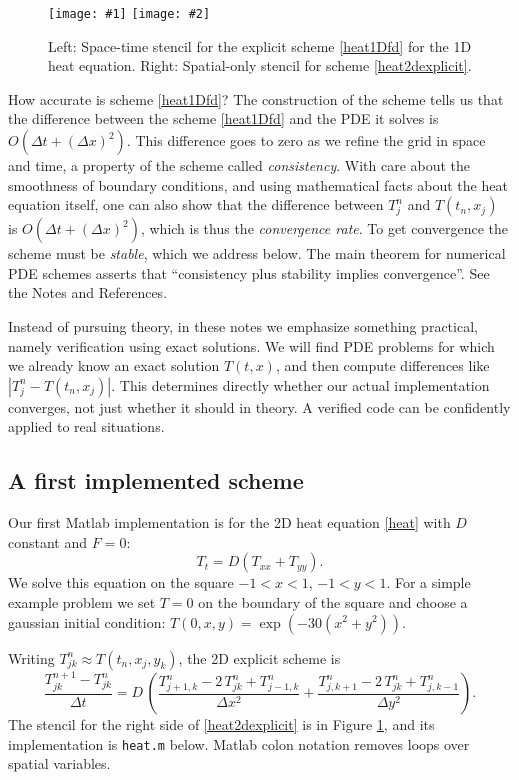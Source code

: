 \documentclass[letterpaper,final,12pt,reqno]{amsart}
\newcommand{\twofigsizes}[5]{
\begin{figure}[ht]
\centering
\texttt{[image: \#1]} \quad
\texttt{[image: \#2]}
\caption{#3}
\label{fig:#1}
\end{figure}}
\begin{document}
\twofigsizes{expstencil}{exp2dstencil}{Left: Space-time stencil for the explicit scheme \eqref{heat1Dfd} for the 1D heat equation.  Right: Spatial-only stencil for scheme \eqref{heat2dexplicit}.}{2.0in}{2.1in}

How accurate is scheme \eqref{heat1Dfd}?  The construction of the scheme tells us that the difference between the scheme \eqref{heat1Dfd} and the PDE it solves is $O(\Delta t + (\Delta x)^2)$.  This difference goes to zero as we refine the grid in space and time, a property of the scheme called \emph{consistency}.  With care about the smoothness of boundary conditions, and using mathematical facts about the heat equation itself, one can also show that the difference between $T_j^n$ and $T(t_n,x_j)$ is $O(\Delta t + (\Delta x)^2)$, which is thus the \emph{convergence rate}.  To get convergence the scheme must be \emph{stable}, which we address below.  The main theorem for numerical PDE schemes asserts that ``consistency plus stability implies convergence''.  See the Notes and References.

Instead of pursuing theory, in these notes we emphasize something practical, namely verification using exact solutions.  We will find PDE problems for which we already know an exact solution $T(t,x)$, and then compute differences like $|T_j^n - T(t_n,x_j)|$.  This determines directly whether our actual implementation converges, not just whether it should in theory.  A verified code can be confidently applied to real situations.

\subsection*{A first implemented scheme}  Our first Matlab implementation is for the 2D heat equation \eqref{heat} with $D$ constant and $F=0$:
\begin{equation}
T_t = D (T_{xx}+T_{yy}).\label{heat2D}
\end{equation}
We solve this equation on the square $-1 < x < 1$, $-1 < y < 1$.  For a simple example problem we set $T=0$ on the boundary of the square and choose a gaussian initial condition: $T(0,x,y) = \exp(-30 (x^2+y^2))$.

Writing $T_{jk}^n \approx T(t_n,x_j,y_k)$, the 2D explicit scheme is
\begin{equation}
	\frac{T_{jk}^{n+1} - T_{jk}^n}{\Delta t} = D\,\left(\frac{T_{j+1,k}^n - 2\, T_{jk}^n + T_{j-1,k}^n}{\Delta x^2} + \frac{T_{j,k+1}^n - 2\, T_{jk}^n + T_{j,k-1}^n}{\Delta y^2}\right). \label{heat2dexplicit}
\end{equation}
The stencil for the right side of \eqref{heat2dexplicit} is in Figure \ref{fig:expstencil}, and its implementation is \texttt{heat.m} below.  Matlab colon notation removes loops over spatial variables.
\end{document}

